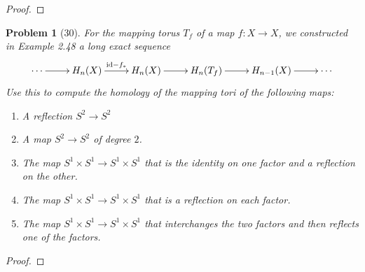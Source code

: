 \documentclass[10pt]{article}
\newcommand{\sk}{\vskip 10mm}
\theoremstyle{plain}
\newtheorem{problem}{Problem}
\theoremstyle{remark}
\begin{document}
\begin{proof}
  
\end{proof}

\sk

\begin{problem}[30]
  For the mapping torus $T_f$ of a map $f: X\rightarrow X$,
  we constructed in Example 2.48 a long exact sequence
  \[
    \xymatrix{
      \cdots \ar[r] & H_n(X) \ar[r]^{\mathrm{id}-f_*} & H_n(X) \ar[r] & H_n(T_f) \ar[r] & H_{n-1}(X) \ar[r] & \cdots
    }
  \]
  Use this to compute the homology of the mapping tori of the following maps:
  \begin{enumerate}
  \item[(a)] A reflection $S^2\rightarrow S^2$
  \item[(b)] A map $S^2\rightarrow S^2$ of degree $2$.
  \item[(c)] The map $S^1\times S^1\rightarrow S^1\times S^1$ that is the
    identity on one factor and a reflection on the other.
  \item[(d)] The map $S^1\times S^1\rightarrow S^1\times S^1$ that is a
    reflection on each factor.
  \item[(e)] The map $S^1\times S^1\rightarrow S^1\times S^1$ that interchanges
    the two factors and then reflects one of the factors.
  \end{enumerate}
\end{problem}

\begin{proof}
  
\end{proof}

\sk

\end{document}
